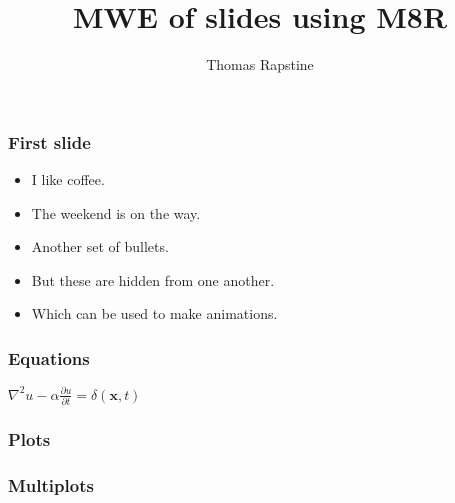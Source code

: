 \title{MWE of slides using M8R}
\author{Thomas Rapstine}
\date{}

\maketitle

\begin{frame} \frametitle{First slide}
    \begin{itemize}
        \item I like coffee.
        \item The weekend is on the way.
    \end{itemize}
    \pause
    \begin{itemize}
        \item Another set of bullets.
            \pause
        \item But these are hidden from one another.
            \pause
        \item Which can be used to make animations.
    \end{itemize}
\end{frame}

\begin{frame} \frametitle{Equations}
    \Huge{$\nabla^2 u - \alpha \frac{\partial u}{\partial t} = \delta(\mathbf{x},t)$}
\end{frame}

\begin{frame} \frametitle{Plots}
\end{frame}

\begin{frame} \frametitle{Multiplots}
\end{frame}
